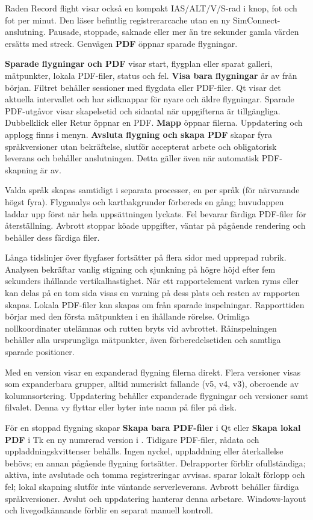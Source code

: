 \documentclass[11pt,a4paper]{article}
\newcommand{\filepath}[1]{\path{#1}}
\newcommand{\ui}[1]{\textbf{#1}}
\begin{document}
Raden Record flight visar också en kompakt IAS/ALT/V/S-rad i knop, fot och
fot per minut. Den läser befintlig registrerarcache utan en ny
SimConnect-anslutning. Pausade, stoppade, saknade eller mer än tre sekunder
gamla värden ersätts med streck. Genvägen \ui{PDF} öppnar sparade flygningar.

\ui{Sparade flygningar och PDF} visar start, flygplan eller sparat galleri,
mätpunkter, lokala PDF-filer, status och fel. \ui{Visa bara flygningar} är
av från början. Filtret behåller sessioner med flygdata eller PDF-filer.
Qt visar det aktuella intervallet och har sidknappar för nyare och äldre flygningar.
Sparade PDF-utgåvor visar skapelsetid och sidantal när uppgifterna är tillgängliga.
Dubbelklick eller Retur öppnar en PDF. \ui{Mapp} öppnar filerna.
Uppdatering och applogg finns i menyn. \ui{Avsluta flygning och skapa PDF}
skapar fyra språkversioner utan bekräftelse, slutför accepterat arbete och
obligatorisk leverans och behåller anslutningen. Detta gäller
även när automatisk PDF-skapning är av.

Valda språk skapas samtidigt i separata processer, en per språk (för närvarande
högst fyra). Flyganalys och kartbakgrunder förbereds en gång; huvudappen laddar
upp först när hela uppsättningen lyckats. Fel bevarar färdiga PDF-filer för
återställning. Avbrott stoppar köade uppgifter, väntar på pågående rendering
och behåller dess färdiga filer.

Långa tidslinjer över flygfaser fortsätter på flera sidor med upprepad rubrik.
Analysen bekräftar vanlig stigning och sjunkning på högre höjd efter fem
sekunders ihållande vertikalhastighet. När ett rapportelement varken ryms
eller kan delas på en tom sida visas en varning på dess plats och resten av
rapporten skapas. Lokala PDF-filer kan skapas om från sparade inspelningar.
Rapporttiden börjar med den första mätpunkten i en ihållande rörelse.
Orimliga nollkoordinater utelämnas och rutten bryts vid avbrottet.
Råinspelningen behåller alla ursprungliga mätpunkter, även förberedelsetiden
och samtliga sparade positioner.

Med en version visar en expanderad flygning filerna direkt. Flera versioner
visas som expanderbara grupper, alltid numeriskt fallande (v5, v4, v3),
oberoende av kolumnsortering. Uppdatering behåller expanderade flygningar och
versioner samt filvalet. Denna vy flyttar eller byter inte namn på filer på
disk.

För en stoppad flygning skapar \ui{Skapa bara PDF-filer} i Qt eller
\ui{Skapa lokal PDF} i Tk en ny numrerad version i
\filepath{reports/}. Tidigare PDF-filer,
rådata och uppladdningskvittenser behålls. Ingen nyckel, uppladdning eller
återkallelse behövs; en annan pågående flygning fortsätter. Delrapporter
förblir ofullständiga; aktiva, inte avslutade och tomma registreringar avvisas.
\filepath{manual-report.json} sparar lokalt förlopp och fel; lokal skapning
slutför inte väntande serverleverans. Avbrott behåller färdiga språkversioner.
Avslut och uppdatering hanterar denna arbetare. Windows-layout och
livegodkännande förblir en separat manuell kontroll.
\end{document}
